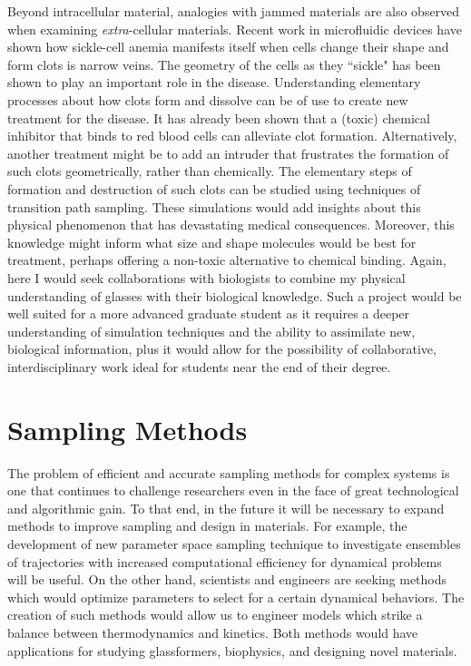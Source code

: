 \documentclass[11pt]{article}
\begin{document}
Beyond intracellular material, analogies with jammed materials are also observed when examining {\textit{ extra}}-cellular materials. Recent work in microfluidic devices have shown how sickle-cell anemia manifests itself when cells change their shape and form clots is narrow veins.  The geometry of the cells as they ``sickle" has been shown to play an important role in the disease.  Understanding elementary processes about how clots form and dissolve can be of use to create new treatment for the disease.  It has already been shown that a (toxic) chemical inhibitor that binds to red blood cells can alleviate clot formation.  %
Alternatively, another treatment might be to add an intruder that frustrates the formation of such clots geometrically, rather than chemically.  The elementary steps of formation and destruction of such clots can be studied using techniques of transition path sampling.  These simulations would add insights about this physical phenomenon that has devastating medical consequences.  Moreover, this knowledge might inform what size and shape molecules would be best for treatment, perhaps offering a non-toxic alternative to chemical binding.  Again, here I would seek collaborations with biologists to combine my physical understanding of glasses with their biological knowledge.    
Such a project would be well suited for a more advanced graduate student as it requires a deeper understanding of simulation techniques and the ability to assimilate new, biological information, plus it would allow for the possibility of collaborative, interdisciplinary work ideal for students near the end of their degree.

\section{Sampling Methods}

The problem of efficient and accurate sampling methods for complex systems is one that continues to challenge researchers even in the face of great technological and algorithmic gain.  To that end, in the future it will be necessary to expand methods to improve sampling and design in materials.  For example, the development of new parameter space sampling technique to investigate ensembles of trajectories with increased computational efficiency for dynamical problems will be useful.  On the other hand, scientists and engineers are seeking methods which would optimize parameters to select for a certain dynamical behaviors.  The creation of such methods would allow us to engineer models which strike a balance between thermodynamics and kinetics.  Both methods would have applications for studying glassformers, biophysics, and designing novel materials.
\end{document}
